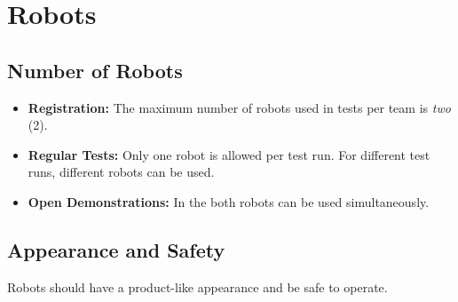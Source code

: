 \section{Robots}
\label{sec:rules:robots}

\subsection{Number of Robots}
\label{sec:rules:robotsnumber}

\begin{itemize}
	\item \textbf{Registration:} The maximum number of robots used in tests per team is \emph{two} (2).
	\item \textbf{Regular Tests:} Only one robot is allowed per test run. For different test runs, different robots can be used.
	\item \textbf{Open Demonstrations:} In the  both robots can be used simultaneously.
\end{itemize}

\subsection{Appearance and Safety}
\label{sec:rules:robotappearance}

Robots should have a product-like appearance and be safe to operate.







